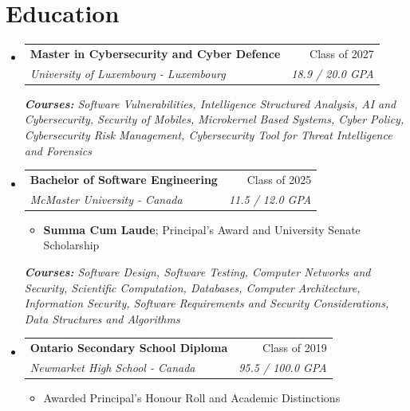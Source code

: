 \documentclass[a4paper,11pt]{article}
\makeatletter
\newcommand{\headingFour}[4]{
	\item
	\begin{tabular*}{0.97\textwidth}{l@{\extracolsep{\fill}}r}
	\textbf{\large\textcolor{customBlue}{#1}} & {#2} \\
	\textit{#3} & \textit{#4} \\
	\end{tabular*}\vspace{-6pt}
}
\makeatother
\begin{document}
\section{Education}
\begin{itemize}[leftmargin=*]
\headingFour{Master in Cybersecurity and Cyber Defence}{Class of 2027}
{University of Luxembourg - Luxembourg}{18.9 / 20.0 GPA}
\vspace{-5pt}
{\scriptsize\textit{\footnotesize{\textbf{Courses:} Software Vulnerabilities, Intelligence Structured Analysis, AI and Cybersecurity, Security of Mobiles, Microkernel Based Systems, Cyber Policy, Cybersecurity Risk Management, Cybersecurity Tool for Threat Intelligence and Forensics}}}

\headingFour{Bachelor of Software Engineering}{Class of 2025}
{McMaster University - Canada}{11.5 / 12.0 GPA}
\begin{itemize}
	\item{\textbf{Summa Cum Laude}; Principal's Award and University Senate Scholarship}\vspace{-2pt}
\end{itemize}\vspace{-5pt}
{\scriptsize\textit{\footnotesize{\textbf{Courses:} Software Design, Software Testing, Computer Networks and Security, Scientific Computation, Databases, Computer Architecture, Information Security, Software Requirements and Security Considerations, Data Structures and Algorithms}}}

\headingFour{Ontario Secondary School Diploma}{Class of 2019}
{Newmarket High School - Canada}{95.5 / 100.0 GPA}
\begin{itemize}
	\item{Awarded Principal's Honour Roll and Academic Distinctions}\vspace{-2pt}
\end{itemize}

\end{itemize}

\end{document}
